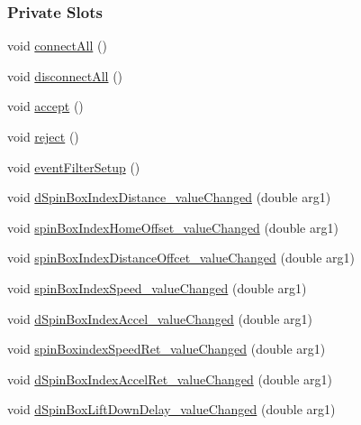 \subsubsection*{Private Slots}
\begin{DoxyCompactItemize}
\item 
void \mbox{\hyperlink{classIndexerSettingDialog_a4d7f2f508e87ac980d21557f5a18a216}{connect\+All}} ()
\item 
void \mbox{\hyperlink{classIndexerSettingDialog_a1a3a501889727528a4f432b233556760}{disconnect\+All}} ()
\item 
void \mbox{\hyperlink{classIndexerSettingDialog_a32e867b5d070ed40929837ebc4b45a78}{accept}} ()
\item 
void \mbox{\hyperlink{classIndexerSettingDialog_a36fd628fd129e8fab31e7876085d1a71}{reject}} ()
\item 
void \mbox{\hyperlink{classIndexerSettingDialog_a1843f10a012a547c32953866ecece54b}{event\+Filter\+Setup}} ()
\item 
void \mbox{\hyperlink{classIndexerSettingDialog_af2f32d79f004b22b713fa30fa0952364}{d\+Spin\+Box\+Index\+Distance\+\_\+value\+Changed}} (double arg1)
\item 
void \mbox{\hyperlink{classIndexerSettingDialog_a589985949822923031a396092d4f24c0}{spin\+Box\+Index\+Home\+Offset\+\_\+value\+Changed}} (double arg1)
\item 
void \mbox{\hyperlink{classIndexerSettingDialog_ae65f25d6b260c3534ef2e03745e54a07}{spin\+Box\+Index\+Distance\+Offcet\+\_\+value\+Changed}} (double arg1)
\item 
void \mbox{\hyperlink{classIndexerSettingDialog_a52510947409dd78b5262bfc320ce85d0}{spin\+Box\+Index\+Speed\+\_\+value\+Changed}} (double arg1)
\item 
void \mbox{\hyperlink{classIndexerSettingDialog_a89996434374b3f24dd26ebf9aae81de4}{d\+Spin\+Box\+Index\+Accel\+\_\+value\+Changed}} (double arg1)
\item 
void \mbox{\hyperlink{classIndexerSettingDialog_a077a9cde82a08f7ae66654cf26a452bd}{spin\+Boxindex\+Speed\+Ret\+\_\+value\+Changed}} (double arg1)
\item 
void \mbox{\hyperlink{classIndexerSettingDialog_a7084aa1c59b526f1e3ea07b2e9a23b56}{d\+Spin\+Box\+Index\+Accel\+Ret\+\_\+value\+Changed}} (double arg1)
\item 
void \mbox{\hyperlink{classIndexerSettingDialog_a02d9d9a3c2b76d6576334a48752be9d7}{d\+Spin\+Box\+Lift\+Down\+Delay\+\_\+value\+Changed}} (double arg1)
\item 

\end{DoxyCompactItemize}
